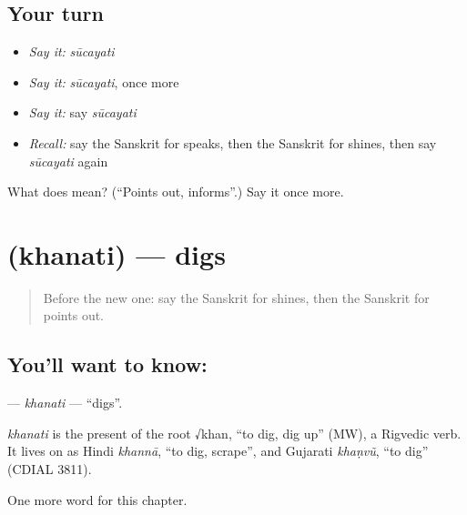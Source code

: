 \subsection*{Your turn}
\begin{itemize}
\raggedright
  \item \emph{Say it:} \emph{sūcayati}
  \item \emph{Say it:} \emph{sūcayati}, once more
  \item \emph{Say it:} say \emph{sūcayati}
  \item \emph{Recall:} say the Sanskrit for speaks, then the Sanskrit for shines, then say \emph{sūcayati} again
\end{itemize}

\begin{tcolorbox}[breakable,colback=teal!4,colframe=teal!35!black,title={Before you move on}]
What does  mean? (\textquotedblleft{}Points out, informs\textquotedblright{}.) Say it once more.
\end{tcolorbox}
\section[\texorpdfstring{\sk{खनति} (khanati)}{खनति (khanati)}]{ (khanati) — digs}

\label{lesson:SA-C204-khanati}



\begin{quote}
Before the new one: say the Sanskrit for shines, then the Sanskrit for points out.
\end{quote}

\subsection*{You'll want to know: }
\textbf{} — \emph{khanati} — \textquotedblleft{}digs\textquotedblright{}.

\begin{cousinweb}
\emph{khanati} is the present of the root √khan, \textquotedblleft{}to dig, dig up\textquotedblright{} (MW), a Rigvedic verb. It lives on as Hindi \emph{khannā}, \textquotedblleft{}to dig, scrape\textquotedblright{}, and Gujarati \emph{khaṇvũ}, \textquotedblleft{}to dig\textquotedblright{} (CDIAL 3811).
\end{cousinweb}

\begin{grammarlens}[title={What you've built}]
One more word for this chapter.
\end{grammarlens}

